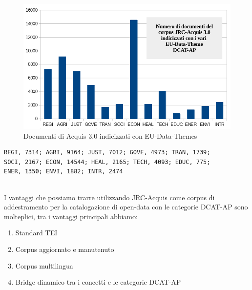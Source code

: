 \documentclass{article}
\theoremstyle{plain}
\theoremstyle{definition}
\begin{document}
\begin{figure}[htbp]
\begin{center}
\includegraphics[scale=0.70]{img/numacquis.png}
\caption{Documenti di Acquis 3.0 indicizzati con EU-Data-Themes}
\end{center}
\end{figure}
\begin{verbatim}
REGI, 7314; AGRI, 9164; JUST, 7012; GOVE, 4973; TRAN, 1739;
SOCI, 2167; ECON, 14544; HEAL, 2165; TECH, 4093; EDUC, 775;
ENER, 1350; ENVI, 1882; INTR, 2474
\end{verbatim}
\phantom
\\
I vantaggi che possiamo trarre utilizzando JRC-Acquis come corpus di addestramento per la catalogazione di open-data con le categorie DCAT-AP sono molteplici, tra i vantaggi principali abbiamo: 

\begin{enumerate}
\item Standard TEI
\item Corpus aggiornato e manutenuto
\item Corpus multilingua
\item Bridge dinamico tra i concetti e le categorie DCAT-AP
\end{enumerate}
\end{document}
